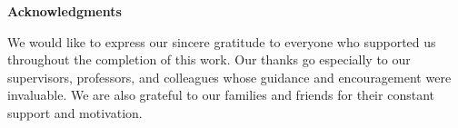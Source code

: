 \begin{center}
    {%
        \Large\bfseries
        Acknowledgments
    }
\end{center}

\noindent
We would like to express our sincere gratitude to everyone who supported us throughout the completion of this work. Our thanks go especially to our supervisors, professors, and colleagues whose guidance and encouragement were invaluable. We are also grateful to our families and friends for their constant support and motivation.
